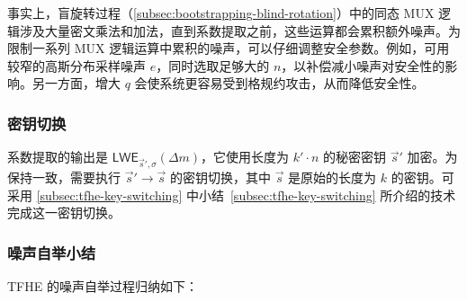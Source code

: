 事实上，盲旋转过程（\autoref{subsec:bootstrapping-blind-rotation}）中的同态 MUX 逻辑涉及大量密文乘法和加法，直到系数提取之前，这些运算都会累积额外噪声。为限制一系列 MUX 逻辑运算中累积的噪声，可以仔细调整安全参数。例如，可用较窄的高斯分布采样噪声 $e$，同时选取足够大的 $n$，以补偿减小噪声对安全性的影响。另一方面，增大 $q$ 会使系统更容易受到格规约攻击，从而降低安全性。


\subsubsection{密钥切换}
\label{subsec:bootstrapping-key-switch} 

系数提取的输出是 $\textsf{LWE}_{\vec{s}', \sigma}(\Delta m)$，它使用长度为 $k'\cdot n$ 的秘密密钥 $\vec{s}'$ 加密。为保持一致，需要执行 $\vec{s}' \rightarrow \vec{s}$ 的密钥切换，其中 $\vec{s}$ 是原始的长度为 $k$ 的密钥。可采用 \autoref{subsec:tfhe-key-switching} 中小结~\ref*{subsec:tfhe-key-switching} 所介绍的技术完成这一密钥切换。



\subsubsection{噪声自举小结}
\label{subsec:tfhe-summary}

TFHE 的噪声自举过程归纳如下：

